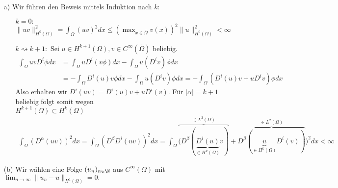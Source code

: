 \begin{solution}

\begin{itemize}
  \item[a)] Wir führen den Beweis mittels Induktion nach $k$:
  \begin{itemize}
    \item[$k = 0:$] $\|uv\|_{H^0(\Omega)}^2 = \int_\Omega (uv)^2 dx \leq
    \left(\max_{x \in \overline{\Omega}}v(x)\right)^2 \|u\|_{H^0(\Omega)}^2 < \infty$
    \item[$k \rightsquigarrow k+1:$] Sei $u \in H^{k+1}(\Omega), v \in C^{\infty}(\overline{\Omega})$
    beliebig.
    \begin{align*}
      \int_\Omega uvD^i\phi dx &= \int_\Omega u D^i(v\phi)dx  - \int_\Omega u(D^i v)\phi dx \\
      &= -\int_\Omega D^i(u)v\phi dx - \int_\Omega u(D^iv)\phi dx
      = -\int_\Omega (D^i(u)v + uD^iv)\phi dx
    \end{align*}
    Also erhalten wir $D^i(uv) = D^i(u)v + uD^i(v)$. Für $|\alpha| = k + 1$ beliebig
    folgt somit wegen \\
    $H^{k+1}(\Omega) \subset H^k(\Omega)$
    \begin{align*}
      \int_\Omega (D^{\alpha}(uv))^2 dx = \int_\Omega (D^\beta D^i (uv))^2 dx
    = \int_\Omega \overbrace{(D^\beta(\underbrace{D^i(u)}_{\in H^k(\Omega)}v)}^{\in L^2(\Omega)}
      + \overbrace{D^\beta(\underbrace{u}_{\in H^k(\Omega)}D^i(v))}^{\in L^2(\Omega)})^2 dx < \infty
    \end{align*}
  \end{itemize}
  \item[(b)] Wir wählen eine Folge $(u_n)_{n \in \N}$ aus $C^\infty(\Omega)$ mit $\lim_{n \rightarrow \infty} \|u_n - u\|_{H^1(\Omega)} = 0.$


\end{itemize}
\end{solution}
